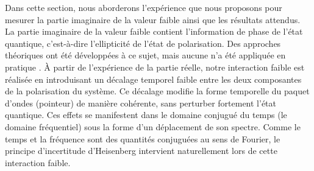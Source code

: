 \begin{onehalfspace}
    Dans cette section, nous aborderons l'expérience que nous 
    proposons pour mesurer la partie imaginaire de la valeur faible 
    ainsi que les résultats attendus. La partie imaginaire de la valeur 
    faible contient l'information de phase de l'état quantique, 
    c’est-à-dire l’ellipticité de l'état de polarisation. 
    Des approches théoriques ont été développées à ce sujet, mais aucune 
    n’a été appliquée en pratique \cite{OpticalNetworks, Time_delay_china}.
    À partir de l'expérience de la partie réelle, notre interaction 
    faible est réalisée en introduisant un décalage temporel faible entre 
    les deux composantes de la polarisation du système. Ce décalage modifie la 
    forme temporelle du paquet d’ondes (pointeur) de manière cohérente, 
    sans perturber fortement l’état quantique. Ces effets se manifestent 
    dans le domaine conjugué du temps (le domaine fréquentiel) sous la forme d’un déplacement de
    son spectre. Comme le temps et la fréquence sont des 
    quantités conjuguées au sens de Fourier, le principe d’incertitude 
    d’Heisenberg intervient naturellement lors de cette interaction faible.
\end{onehalfspace}